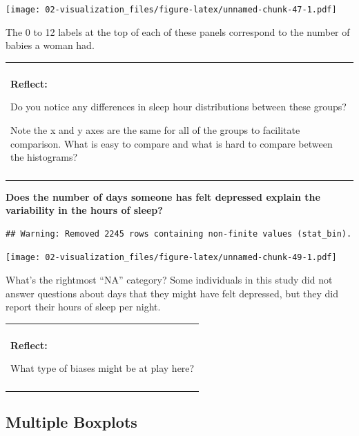 \documentclass[
]{book}
\newenvironment{Shaded}{\begin{snugshade}}{\end{snugshade}}
\newcommand{\DataTypeTok}[1]{\textcolor[rgb]{0.13,0.29,0.53}{#1}}
\newcommand{\DecValTok}[1]{\textcolor[rgb]{0.00,0.00,0.81}{#1}}
\newcommand{\KeywordTok}[1]{\textcolor[rgb]{0.13,0.29,0.53}{\textbf{#1}}}
\newcommand{\NormalTok}[1]{#1}
\newcommand{\OperatorTok}[1]{\textcolor[rgb]{0.81,0.36,0.00}{\textbf{#1}}}
\newcommand{\StringTok}[1]{\textcolor[rgb]{0.31,0.60,0.02}{#1}}
\newenvironment{reflect}
{
    \begin{center}
    
    \begin{tabular}{|p{0.8\textwidth}|}
    \rowcolor{LightBlue}
    \hline\\
    \rowcolor{LightBlue}
    \textbf{Reflect:}
}
{
    \\\rowcolor{LightBlue}
    \\\hline
    \end{tabular} 
    \end{center}
}
\begin{document}
\texttt{[image: 02-visualization\_files/figure-latex/unnamed-chunk-47-1.pdf]}

The 0 to 12 labels at the top of each of these panels correspond to the number of babies a woman had.

\begin{reflect}
Do you notice any differences in sleep hour distributions between these
groups?

Note the x and y axes are the same for all of the groups to facilitate
comparison. What is easy to compare and what is hard to compare between
the histograms?
\end{reflect}

\textbf{Does the number of days someone has felt depressed explain the variability in the hours of sleep?}

\begin{Shaded}
\end{Shaded}

\begin{verbatim}
## Warning: Removed 2245 rows containing non-finite values (stat_bin).
\end{verbatim}

\texttt{[image: 02-visualization\_files/figure-latex/unnamed-chunk-49-1.pdf]}

What's the rightmost ``NA'' category? Some individuals in this study did not answer questions about days that they might have felt depressed, but they did report their hours of sleep per night.

\begin{reflect}
What type of biases might be at play here?
\end{reflect}

\hypertarget{multiple-boxplots}{%
\subsection{Multiple Boxplots}\label{multiple-boxplots}}
\end{document}
